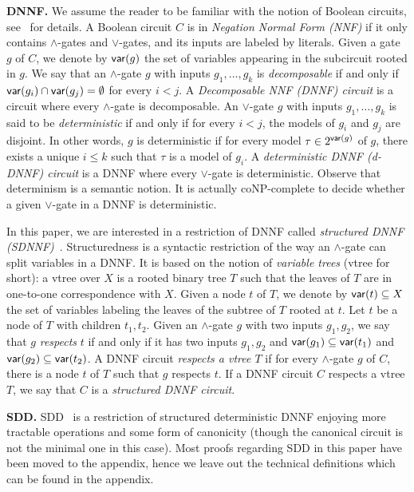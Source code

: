 \documentclass[a4paper,UKenglish,cleveref, autoref, thm-restate]{lipics-v2021}
\begin{document}
\textbf{DNNF.} We assume the reader to be familiar with the notion of Boolean circuits, see~\cite{AroraB09} for details. A Boolean circuit $C$ is in \emph{Negation Normal Form (NNF)} if it only contains $\wedge$-gates and $\vee$-gates, and its inputs are labeled by literals. Given a gate $g$ of $C$, we denote by $\mathsf{var}(g)$ the set of variables appearing in the subcircuit rooted in $g$. We say that an $\wedge$-gate $g$ with inputs $g_1,\dots,g_k$ is \emph{decomposable} if and only if $\mathsf{var}(g_i) \cap \mathsf{var}(g_j) = \emptyset$ for every $i<j$. A \emph{Decomposable NNF (DNNF) circuit} is a circuit where every $\wedge$-gate is decomposable.
%
An $\vee$-gate $g$ with inputs $g_1,\dots,g_k$ is said to be \emph{deterministic} if and only if for every $i<j$, the models of $g_i$ and
$g_j$ are disjoint. In other words, $g$ is deterministic if for every model $\tau \in 2^{\mathsf{var}(g)}$ of $g$, there exists a unique $i \leq k$ such that $\tau$ is a model of $g_i$. A \emph{deterministic DNNF (d-DNNF) circuit} is a DNNF where every $\vee$-gate is deterministic. Observe that determinism is a semantic notion. It is actually coNP-complete to decide whether a given $\vee$-gate in a DNNF is deterministic.%

In this paper, we are interested in a restriction of DNNF called \emph{structured DNNF (SDNNF)}~\cite{PipatsrisawatD08}. Structuredness is a syntactic restriction of the way an $\wedge$-gate can split variables in a DNNF. It is based on the notion of \emph{variable trees} (vtree for short): a vtree over $X$ is a rooted binary tree $T$ such that the leaves of $T$ are in one-to-one correspondence with $X$.  Given a node $t$ of $T$, we denote by $\mathsf{var}(t) \subseteq X$ the set of variables labeling the leaves of the subtree of $T$ rooted at $t$. Let $t$ be a node of $T$ with children $t_1,t_2$. Given an $\wedge$-gate $g$ with two inputs $g_1,g_2$, we say that $g$ \emph{respects} $t$ if and only if it has two inputs $g_1,g_2$ and $\mathsf{var}(g_1) \subseteq \mathsf{var}(t_1)$ and $\mathsf{var}(g_2) \subseteq \mathsf{var}(t_2)$. A DNNF circuit \emph{respects a vtree $T$} if for every $\wedge$-gate $g$ of $C$, there is a node $t$ of $T$ such that $g$ respects $t$. If a DNNF circuit $C$ respects a vtree $T$, we say that $C$ is a \emph{structured DNNF circuit}.

\textbf{SDD.} SDD~\cite{Darwiche11} is a restriction of structured deterministic DNNF enjoying more tractable operations and some form of canonicity (though the canonical circuit is not the minimal one in this case). Most proofs regarding SDD in this paper have been moved to the appendix, hence we leave out the technical definitions which can be found in the appendix. 
\end{document}
